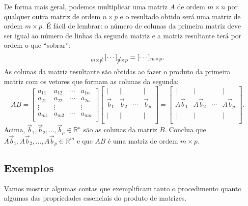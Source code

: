 De forma mais geral, podemos multiplicar uma matriz $A$ de ordem $m \times n$ por qualquer outra matriz de ordem $n \times p$ e o resultado obtido será uma matriz de ordem $m \times p$. É fácil de lembrar: o número de colunas da primeira matriz deve ser igual ao número de linhas da segunda matriz e a matriz resultante terá por ordem o que  ``sobrar'':
\begin{equation}
[\cdots]_{m \times \cancel{n}} \, [\cdots]_{\cancel{n} \times p} = [\cdots]_{m \times p}.
\end{equation} As colunas da matriz resultante são obtidas ao fazer o produto da primeira matriz com os vetores que formam as colunas da segunda:
\begin{equation}
A B =
\left[
\begin{array}{cccc}
a_{11} & a_{12} & \cdots & a_{1n} \\
a_{21} & a_{22} & \cdots & a_{2n} \\
\vdots & \vdots &        & \vdots \\
a_{m1} & a_{m2} & \cdots & a_{mn} \\
\end{array}
\right]
\left[
\begin{array}{cccc}
| & |  &   & | \\
\vec{b}_{1} & \vec{b}_{2} & \cdots & \vec{b}_{p} \\
| & |  &   & | \\
\end{array}
\right] =
\left[
\begin{array}{cccc}
| & |  &   & | \\
A\vec{b}_{1} & A\vec{b}_{2} & \cdots & A\vec{b}_{p} \\
| & |  &   & | \\
\end{array}
\right].
\end{equation} Acima, $\vec{b}_{1}, \vec{b}_{2}, \dots, \vec{b}_{p} \in \mathbb{R}^n$ são as colunas da matriz $B$. Conclua que $A\vec{b}_{1}, A\vec{b}_{2}, \dots, A\vec{b}_{p} \in \mathbb{R}^m$ e que $AB$ é uma matriz de ordem $m \times p$.

\subsection{Exemplos}

Vamos mostrar algumas contas que exemplificam tanto o procedimento quanto algumas das propriedades essenciais do produto de matrizes.


